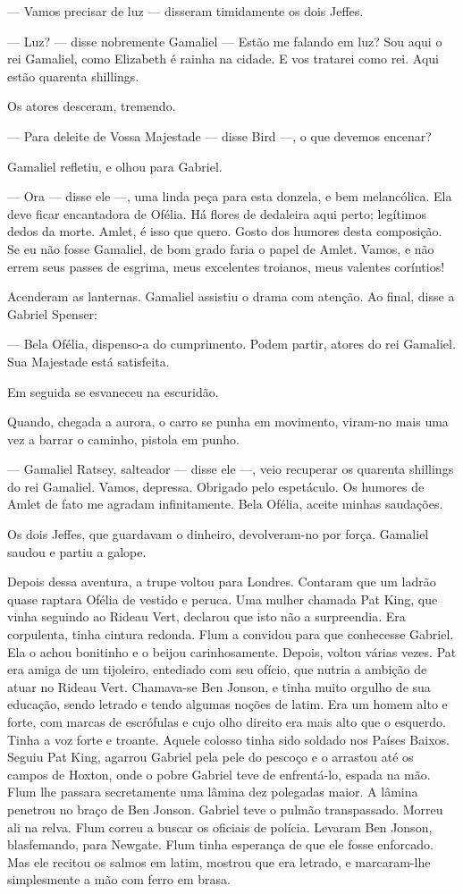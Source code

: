 --- Vamos precisar de luz --- disseram timidamente os dois Jeffes.

--- Luz? --- disse nobremente Gamaliel --- Estão me falando em luz? Sou aqui o rei
Gamaliel, como Elizabeth é rainha na cidade. E vos tratarei como rei. Aqui
estão quarenta shillings.

Os atores desceram, tremendo.

--- Para deleite de Vossa Majestade --- disse Bird ---, o que devemos encenar?

Gamaliel refletiu, e olhou para Gabriel.

--- Ora --- disse ele ---, uma linda peça para esta donzela, e bem melancólica. Ela
deve ficar encantadora de Ofélia. Há flores de dedaleira aqui perto;
legítimos dedos da morte. Amlet, é isso que quero. Gosto dos humores desta
composição. Se eu não fosse Gamaliel, de bom grado faria o papel de Amlet.
Vamos, e não errem seus passes de esgrima, meus excelentes troianos, meus
valentes coríntios!

Acenderam as lanternas. Gamaliel assistiu o drama com atenção. Ao final,
disse a Gabriel Spenser:

--- Bela Ofélia, dispenso-a do cumprimento. Podem partir, atores do rei
Gamaliel. Sua Majestade está satisfeita.

Em seguida se esvaneceu na escuridão.

Quando, chegada a aurora, o carro se punha em movimento, viram-no mais uma
vez a barrar o caminho, pistola em punho.

--- Gamaliel Ratsey, salteador --- disse ele ---, veio recuperar os quarenta
shillings do rei Gamaliel. Vamos, depressa. Obrigado pelo espetáculo. Os
humores de Amlet de fato me agradam infinitamente. Bela Ofélia, aceite
minhas saudações.

Os dois Jeffes, que guardavam o dinheiro, devolveram-no por força. Gamaliel
saudou e partiu a galope.

Depois dessa aventura, a trupe voltou para Londres. Contaram que um ladrão
quase raptara Ofélia de vestido e peruca. Uma mulher chamada Pat King, que
vinha seguindo ao Rideau Vert, declarou que isto não a surpreendia. Era
corpulenta, tinha cintura redonda. Flum a convidou para que conhecesse
Gabriel. Ela o achou bonitinho e o beijou carinhosamente. Depois, voltou
várias vezes. Pat era amiga de um tijoleiro, entediado com seu
ofício, que nutria a ambição de atuar no Rideau Vert. Chamava-se Ben
Jonson, e tinha muito orgulho de sua educação, sendo letrado e tendo
algumas noções de latim. Era um homem alto e forte, com marcas de
escrófulas e cujo olho direito era mais alto que o esquerdo. Tinha a voz
forte e troante. Aquele colosso tinha sido soldado nos Países Baixos.
Seguiu Pat King, agarrou Gabriel pela pele do pescoço e o arrastou até os
campos de Hoxton, onde o pobre Gabriel teve de enfrentá-lo, espada na mão.
Flum lhe passara secretamente uma lâmina dez polegadas maior. A lâmina
penetrou no braço de Ben Jonson. Gabriel teve o pulmão transpassado.
Morreu ali na relva. Flum correu a buscar os oficiais de polícia. Levaram
Ben Jonson, blasfemando, para Newgate. Flum tinha esperança de que ele
fosse enforcado. Mas ele recitou os salmos em latim, mostrou que era
letrado, e marcaram-lhe simplesmente a mão com ferro em brasa.

